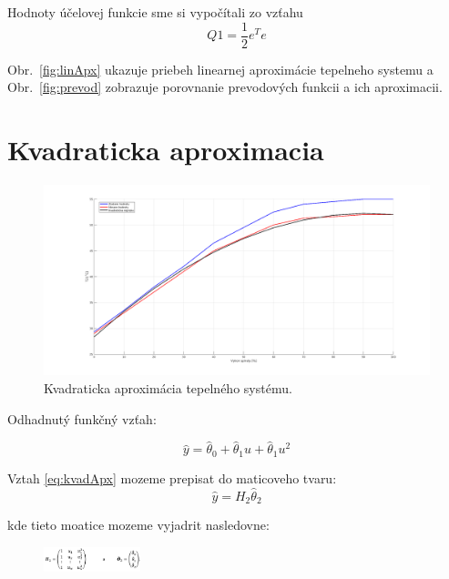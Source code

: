 \documentclass{article}
\begin{document}
Hodnoty účelovej funkcie sme si vypočítali zo vzťahu 
\begin{equation}
	Q1 = \frac{1}{2} e^Te
	\label{eq:objFunkcia}
\end{equation}

Obr.~\ref{fig:linApx} ukazuje priebeh linearnej aproximácie tepelneho systemu a
Obr.~\ref{fig:prevod} zobrazuje porovnanie prevodových funkcii a ich aproximacii.


\clearpage

\section{Kvadraticka aproximacia}
\label{sec:kvad}

\begin{figure}[!htbp]
	\begin{center}
		\includegraphics[width=\textwidth]{include/kvadraticka_regresia.png}
	\end{center}
	\caption{Kvadraticka aproximácia tepelného systému.}
	\label{fig:kvadApx}
\end{figure}

Odhadnutý funkčný vzťah:

\begin{equation}
	\hat{y} = \hat{\theta}_0 + \hat{\theta}_1u + \hat{\theta}_1u^2
	\label{eq:kvadApx}
\end{equation}

Vztah \ref{eq:kvadApx} mozeme prepisat do maticoveho tvaru:
\begin{equation}
	\hat{y} = H_2\hat{\theta}_2
	\label{eq:kvadApx2}
\end{equation}

kde tieto moatice mozeme vyjadrit nasledovne:

\begin{figure}[!htbp]
	\begin{center}
		\includegraphics[width=0.25\textwidth]{include/defHandTheta2.png}
	\end{center}
\end{figure}
\end{document}
